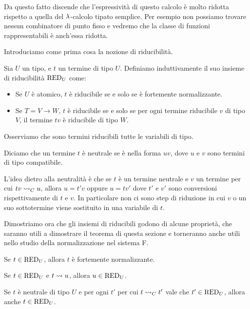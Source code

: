 \documentclass[]{marticle}
\begin{document}
Da questo fatto discende che l'espressivit\`a di questo calcolo \`e molto
ridotta rispetto a quella del $\lambda$-calcolo tipato semplice. Per esempio non
possiamo trovare nessun combinatore di punto fisso e vedremo che la classe di
funzioni rappresentabili \`e anch'essa ridotta.

Introduciamo come prima cosa la nozione di riducibilit\`a. 
\begin{block}[Definizione]
    Sia $U$ un tipo, e $t$ un termine di tipo $U$. Definiamo induttivamente il
    suo insieme di riducibilit\`a $\text{RED}_{U}$ come:
    \begin{itemize}
        \item Se $U$ \`e atomico, $t$ \`e riducibile se e solo se \`e fortemente
            normalizzante.
        \item Se $T = V \rightarrow W$, $t$ \`e riducibile se e solo se per ogni
            termine riducibile $v$ di tipo $V$, il termine $tv$ \`e riducibile
            di tipo $W$.
    \end{itemize}
\end{block}

Osserviamo che sono termini riducibili tutte le variabili di tipo.

\begin{block}[Definizione]
    Diciamo che un termine $t$ \`e neutrale se \`e nella forma $uv$, dove $u$ e
    $v$ sono termini di tipo compatibile.
\end{block}

L'idea dietro alla neutralit\`a \`e che se $t$ \`e un termine neutrale e $v$ un
termine per cui $tv \rightsquigarrow_C u$, allora $u = t' v$ oppure $u=tv'$ dove $t'$ e $v'$
sono conversioni rispettivamente di $t$ e $v$. In particolare non ci sono
step di riduzione in cui $v$ o un suo sottotermine viene sostituito in una
variabile di $t$.

Dimostriamo ora che gli insiemi di riducibili godono di alcune propriet\`a, che
saranno utili a dimostrare il teorema di questa sezione e torneranno anche utili
nello studio della normalizzazione nel sistema F.

\begin{block}[Proposizione]
    \begin{nlist}[CR1]
        \item Se $t\in \text{RED}_{U}$, allora $t$ \`e fortemente normalizzante.
        \item Se $t\in \text{RED}_{U}$ e $t\rightsquigarrow u$, allora $u\in\text{RED}_{U}$.
        \item Se $t$ \`e neutrale di tipo $U$ e per ogni $t'$ per cui $t\rightsquigarrow_C
            t'$ vale che $t'\in\text{RED}_{U}$, allora anche $t\in\text{RED}_{U}$.
    \end{nlist}
\end{block}
\end{document}
